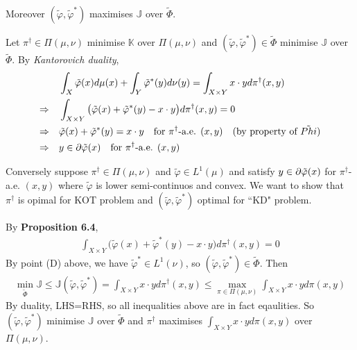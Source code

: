 \documentclass[12pt,a4paper]{article}
\newenvironment{proof}
{\begin{changemargin}{1cm}{0.5cm} 
	}%
	{\end{changemargin}
}
\newenvironment{p}
{\begin{proof} 
	}%
	{\end{proof}
}
\begin{document}
\quad Moreover $(\tilde{\varphi}, \tilde{\varphi}^*)$ maximises $\mathbb{J}$ over $\tilde{\Phi}$.
\begin{p}
\pf Let $\pi^{\dagger} \in \Pi(\mu, \nu)$ minimise $\mathbb{K}$ over $\Pi(\mu, \nu)$ and $(\tilde{\varphi}, \tilde{\varphi}^*) \in \tilde{\Phi}$ minimise $\mathbb{J}$ over $\tilde{\Phi}$. By \emph{Kantorovich duality},
\begin{align*}
&\int_X \tilde{\varphi}(x) d\mu(x) + \int_Y \tilde{\varphi}^*(y) d\nu(y) =\int_{X\times Y} x\cdot y d\pi^{\dagger}(x,y) \\
\Rightarrow \quad  &\int_{X\times Y} \big( \tilde{\varphi}(x) + \tilde{\varphi}^*(y) - x\cdot y\big) d\pi^{\dagger}(x,y) =0 \\
\Rightarrow \quad & \tilde{\varphi}(x) + \tilde{\varphi}^*(y) = x\cdot y \quad \text{for } \pi^{\dagger}\text{-a.e. }(x,y) \quad \text{(by property of } \tilde{Phi}) \\
\Rightarrow \quad &y\in \partial \tilde{\varphi}(x) \quad \text{for } \pi^{\dagger} \text{-a.e. }(x,y) 
\end{align*}

Conversely suppose $\pi^{\dagger} \in \Pi(\mu, \nu)$ and $\tilde{\varphi} \in L^1(\mu)$ and satisfy $y\in \partial \tilde{\varphi}(x)$ for $\pi^{\dagger}$-a.e. $(x,y)$ where $\tilde{\varphi}$ is lower semi-continuos and convex. We want to show that $\pi^{\dagger}$ is opimal for KOT problem and $(\tilde{\varphi}, \tilde{\varphi}^*)$ optimal for ``KD" problem.

\quad By \textbf{Proposition 6.4},
\begin{align*}
\int_{X\times Y} \big( \tilde{\varphi}(x) + \tilde{\varphi}^*(y) - x\cdot y \big) d\pi^{\dagger}(x,y) =0
\end{align*}
By point (D) above, we have $\tilde{\varphi}^* \in L^1(\nu)$, so $(\tilde{\varphi}, \tilde{\varphi}^*) \in \tilde{\Phi}$. Then
\begin{align*}
\min_{\tilde{\Phi}} \mathbb{J} \leq \mathbb{J}(\tilde{\varphi}, \tilde{\varphi}^*) = \int_{X\times Y} x\cdot y d\pi^{\dagger}(x,y) \leq \max_{\pi \in \Pi(\mu, \nu)} \int_{X\times Y} x\cdot y d\pi(x,y)
\end{align*}
By duality, LHS=RHS, so all inequalities above are in fact eqaulities. So $(\tilde{\varphi}, \tilde{\varphi}^*)$ minimise $\mathbb{J}$ over $\tilde{\Phi}$ and $\pi^{\dagger}$ maximises $\int_{X\times Y} x\cdot y d\pi(x,y)$ over $\Pi(\mu, \nu)$.

\eop
\end{p}
\end{document}
